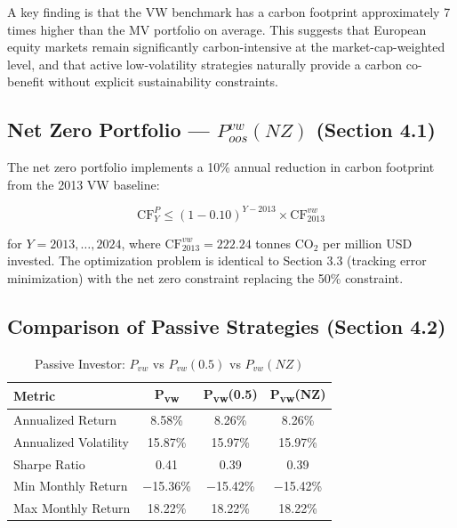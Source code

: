 \documentclass[12pt, a4paper]{article}
\begin{document}
A key finding is that the VW benchmark has a carbon footprint approximately 
7 times higher than the MV portfolio on average. This suggests that European 
equity markets remain significantly carbon-intensive at the market-cap-weighted 
level, and that active low-volatility strategies naturally provide a carbon 
co-benefit without explicit sustainability constraints.

\subsection{Net Zero Portfolio --- $P^{vw}_{oos}(NZ)$ (Section 4.1)}

The net zero portfolio implements a 10\% annual reduction in carbon footprint 
from the 2013 VW baseline:

\[
\text{CF}^P_Y \leq (1 - 0.10)^{Y - 2013} \times \text{CF}^{vw}_{2013}
\]

for $Y = 2013, \ldots, 2024$, where $\text{CF}^{vw}_{2013} = 222.24$ tonnes 
CO$_2$ per million USD invested. The optimization problem is identical to 
Section 3.3 (tracking error minimization) with the net zero constraint 
replacing the 50\% constraint.

\subsection{Comparison of Passive Strategies (Section 4.2)}

\begin{table}[H]
    \centering
    \caption{Passive Investor: $P_{vw}$ vs $P_{vw}(0.5)$ vs $P_{vw}(NZ)$}
    \label{tab:passive_all}
    \begin{tabular}{lccc}
        \toprule
        \textbf{Metric} & \textbf{P\textsubscript{vw}} & 
        \textbf{P\textsubscript{vw}(0.5)} & 
        \textbf{P\textsubscript{vw}(NZ)} \\
        \midrule
        Annualized Return       & 8.58\%     & 8.26\%     & 8.26\%     \\
        Annualized Volatility   & 15.87\%    & 15.97\%    & 15.97\%    \\
        Sharpe Ratio            & 0.41       & 0.39       & 0.39       \\
        Min Monthly Return      & $-$15.36\% & $-$15.42\% & $-$15.42\% \\
        Max Monthly Return      & 18.22\%    & 18.22\%    & 18.22\%    \\
        \bottomrule
    \end{tabular}
\end{table}
\end{document}
